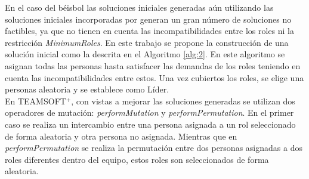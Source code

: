 \scalebox{.88}{
	\begin{algorithm}[H]
		\caption{Asignar personas de forma aleatoria a los roles, estableciendo que el líder juega más de un rol en los equipos}
		\label{alg:const-lider-rol}
		\KwIn {$projects$ \tcp*[l]{Lista de proyectos sin asignación inicial}
			\hspace{1.7cm}        $limitPersonTries$ \tcp*[l]{Número de intentos de poner una persona en un rol} }
		\KwOut {$projects$ \tcp*[l]{Lista de proyectos con asignación inicial}}
		\ForEach{$project \in projects$}
		{$rols = project$.getRoles() \tcp*[l]{roles del proyecto}
			$rols$.remove($boss = project$.getProjectBoss()\;
			\ForEach{$rol \in rols$}
			{$needs=rol$.getNeedWorked()\tcp*[l]{trabajadores necesarios en el rol}
				$count = 0$\;
				\While{$(needs > 0) \And (count < limitPersonTries)$}
				{
					$chosenPerson=$randomPersons()\tcp*[l]{seleccionar aleatoriamente una persona}
					\If{checkIndividualRestrictions($chosePerson,rol$)}
					{$rol=$.getWorkers().add(chosenPerson)\tcp*[l]{se añade si cumple las restricciones}
						$needs--$\;}
					\Else
					{
						$count++$\;}
				}
			}
			$rol$ = getRandomRol($rols$)\tcp*[l]{selecciona un Rol aleatoriamente}
			$worker$=getRandomWorker($rol$.getWorkers())\tcp*[l]{selecciona aleatoriamente un trabajador asignado a ese Rol}
			$boss$.getWorkers().add($worker$)\tcp*[l]{A ese trabajador se asigna el rol de Líder}
			$rols$.add($boss$)\;
		}
	\end{algorithm} \vspace{1cm}
}

En el caso del béisbol las soluciones iniciales generadas aún utilizando las soluciones iniciales incorporadas por \cite{Duran2019} generan un gran número de soluciones no factibles, ya que no tienen en cuenta las incompatibilidades entre los roles ni la restricción \textit{MinimumRoles}. En este trabajo se propone la construcción de una solución inicial como la descrita en el Algoritmo \ref{alg:2}. En este algoritmo se asignan todas las personas hasta satisfacer las demandas de los roles teniendo en cuenta las incompatibilidades entre estos. Una vez cubiertos los roles, se elige una personas aleatoria y se establece como Líder. \\

En TEAMSOFT$^+$, con vistas a mejorar las soluciones generadas se utilizan dos operadores de mutación: \textit{performMutation} y \textit{performPermutation}. En el primer caso se realiza un intercambio entre una persona asignada a un rol seleccionado de forma aleatoria y otra persona no asignada. Mientras que en \textit{performPermutation} se realiza la permutación entre dos personas asignadas a dos roles diferentes dentro del equipo, estos roles son seleccionados de forma aleatoria. \\

